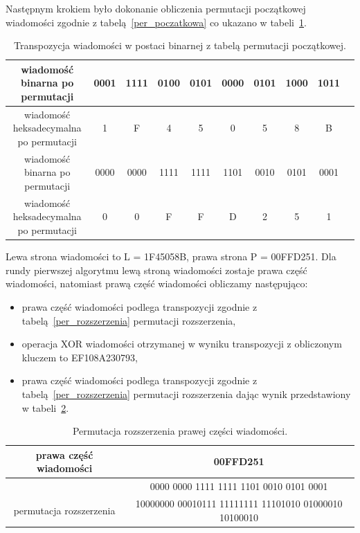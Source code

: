 \documentclass[12p]{article}
\begin{document}
Następnym krokiem było dokonanie obliczenia permutacji początkowej wiadomości zgodnie z tabelą~\ref{per_poczatkowa} co ukazano w tabeli~\ref{per}.

\begin{table}[H]
\centering
\begin{tabular}{|c|c|c|c|c|c|c|c|c|c|}
\hline
wiadomość binarna po permutacji & 0001 & 1111 & 0100 & 0101 & 0000 & 0101 & 1000 & 1011\\ \hline
wiadomość heksadecymalna po permutacji & 1 & F & 4 & 5 & 0 & 5 & 8 & B\\ \hline
wiadomość binarna po permutacji & 0000 & 0000 & 1111 & 1111 & 1101 & 0010 & 0101 & 0001\\ \hline
wiadomość heksadecymalna po permutacji & 0 & 0 & F & F & D & 2 & 5 & 1\\ \hline

\end{tabular}
\caption{Transpozycja wiadomości w postaci binarnej z tabelą permutacji początkowej.}\label{per}
\end{table}



Lewa strona wiadomości to L = 1F45058B, prawa strona P = 00FFD251. 
Dla rundy pierwszej algorytmu lewą stroną wiadomości zostaje prawa część wiadomości, natomiast prawą część wiadomości obliczamy następująco:
\begin{itemize}
\item prawa część wiadomości podlega transpozycji zgodnie z tabelą~\ref{per_rozszerzenia} permutacji rozszerzenia,
\item operacja XOR wiadomości otrzymanej w wyniku transpozycji z obliczonym kluczem to EF108A230793,
\item prawa część wiadomości podlega transpozycji zgodnie z tabelą~\ref{per_rozszerzenia} permutacji rozszerzenia dając wynik przedstawiony w tabeli~\ref{per_rozszerzenia_wiadomosci}.
\end{itemize}

\begin{table}[H]
\centering
\begin{tabular}{|c|c|}
\hline
prawa część wiadomości & 00FFD251\\ \hline
& 0000 0000 1111 1111 1101 0010 0101 0001\\ \hline
permutacja rozszerzenia & 10000000 00010111 11111111 11101010 01000010 10100010\\ \hline
\end{tabular}
\caption{Permutacja rozszerzenia prawej części wiadomości.}\label{per_rozszerzenia_wiadomosci}
\end{table}
\end{document}
